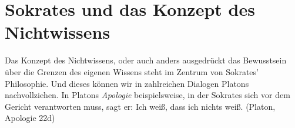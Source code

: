 \documentclass[12pt]{article}
\begin{document}
\section{Sokrates und das Konzept des Nichtwissens}

Das Konzept des Nichtwissens, oder auch anders ausgedrückt das Bewusstsein über die Grenzen des 
eigenen Wissens steht im Zentrum von Sokrates' Philosophie. Und dieses können wir in zahlreichen Dialogen
Platons nachvollziehen. In Platons \textit{Apologie} beispielsweise, in der Sokrates sich vor dem 
Gericht verantworten muss, sagt er: Ich weiß, dass ich nichts weiß. (Platon, Apologie 22d) \parencite[Apologie 22d]{platon-apologie}


\nocite{*}
\printbibliography %
\end{document}
